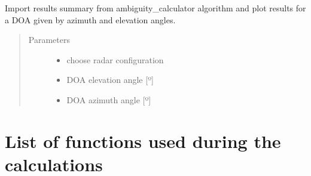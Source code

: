 \documentclass[letterpaper,10pt,english]{sphinxmanual}
\begin{document}
\begin{fulllineitems}
\label{\detokenize{plots_generator:plots_generator.generate_plots}}
Import results summary from ambiguity\_calculator algorithm and plot results for a DOA given by azimuth and elevation
angles.
\begin{quote}\begin{description}
\item[{Parameters}] \leavevmode\begin{itemize}
\item {} 
 \textendash{} choose radar configuration

\item {} 
 \textendash{} DOA elevation angle {[}º{]}

\item {} 
 \textendash{} DOA azimuth angle {[}º{]}

\end{itemize}

\end{description}\end{quote}

\end{fulllineitems}



\chapter{List of functions used during the calculations}
\label{\detokenize{functions:module-functions}}\label{\detokenize{functions:list-of-functions-used-during-the-calculations}}\label{\detokenize{functions::doc}}
\end{document}
